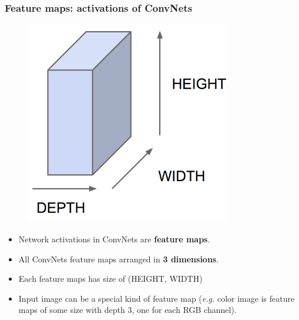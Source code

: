 \documentclass{beamer}
\begin{document}
\begin{frame}
  \frametitle{Feature maps: activations of ConvNets}
  
  \begin{minipage}{0.48\textwidth}
    \begin{figure}[!htm]
      \includegraphics[width=0.8\textwidth]{feature_maps.png}
    \end{figure}
  \end{minipage}
  \begin{minipage}{0.48\textwidth}
    \begin{itemize}
      \item Network activations in ConvNets are \textbf{feature maps}.
      \item All ConvNets feature maps arranged in \textbf{3 dimensions}.
      \item Each feature maps has size of (HEIGHT, WIDTH)
      \item Input image can be a special kind of feature map (\emph{e.g.} color image is feature maps of some size with depth 3, one for each RGB channel).
    \end{itemize}
  \end{minipage}
\end{frame}
\end{document}

